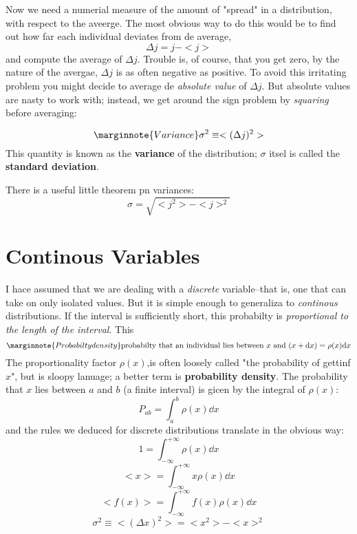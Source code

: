 Now we need a numerial measure of the amount of "spread" in a distribution, with respect to the aveerge. The most obvious way to do this would be to find out how far each individual deviates from de average,
\begin{equation}\label{1.10}
	\Delta j=j-<j>
\end{equation}
and compute the average of $\Delta j$. Trouble is, of course, that you get zero, by the nature of the avergae, $\Delta j$ is as often negative as positive. To avoid this irritating problem you might decide to average de \textit{absolute value} of $\Delta j$. But absolute values are nasty to work with; instead, we get around the sign problem by \textit{squaring} before averaging:

\begin{equation}\label{1.11}\marginnote{Variance}
	\sigma^2\equiv <(\Delta j)^2>
\end{equation}
This quantity is known as the \textbf{variance} of the distribution; $\sigma$ itsel is called the \textbf{standard deviation}. 

There is a useful little theorem pn variances:
\begin{equation}\label{1.12}
	\sigma=\sqrt{<j^2> - <j>^2}
\end{equation}

\section{Continous Variables}
I hace assumed that we are dealing with a \textit{discrete} variable--that is, one that can take on only isolated values. But it is simple enough to generaliza to \textit{continous} distributions. If the interval is sufficiently short, this probabilty is \textit{proportional to the length of the interval}. This
\begin{equation}\label{1.14}\marginnote{Probabilty density}
	\mbox{{probabilty that an individual lies between $x$ and $(x+\dd x)$}}=\rho(x)\dd x
\end{equation}
The proportionality factor $\rho(x)$,is often loosely called "the probability of gettinf $x$", but is sloopy lanuage; a better term is \textbf{probability density}. The probability that $x$ lies between $a$ and $b$ (a finite interval) is gicen by the integral of $\rho(x)$:
\begin{equation}\label{1.15}
	P_{ab}=\int_a^b\rho(x)\dd x
\end{equation}
and the rules we deduced for discrete distributions translate in the obvious way:
\begin{equation}\label{1.16}
	1 = \int_{-\infty}^{+\infty}\rho(x)\dd x
\end{equation}
\begin{equation}\label{1.17}
	<x>=\int_{-\infty}^{+\infty}x\rho(x)\dd x
\end{equation}
\begin{equation}\label{1.18}
	<f(x)>=\int_{-\infty}^{+\infty}f(x)\rho(x)\dd x
\end{equation}
\begin{equation}\label{1.19}
	\sigma^2\equiv <(\Delta x)^2>=<x^2>-<x>^2
\end{equation}

